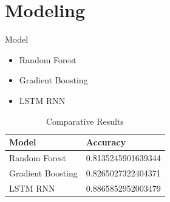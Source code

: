 \documentclass[
 size=14pt,
 paper=smartboard,  %
 mode=present, 		%
 display=slides, 	%
 style=tuliplab,  	%
 pauseslide,
 fleqn,leqno]{powerdot}
\begin{document}
\section{Modeling}


\begin{slide}[toc=,bm=]{Model}

\begin{itemize}
  \item Random Forest
  \item Gradient Boosting
  \item LSTM RNN
\end{itemize}

\begin{table}
\centering
\caption{Comparative Results}

\begin{tabular}{p{150pt} | p{200pt}}
\toprule
  Model & Accuracy\\
\hline
 Random Forest & 0.8135245901639344 \\
 Gradient Boosting & 0.8265027322404371  \\
 LSTM RNN & 0.8865852952003479  \\

\bottomrule

\end{tabular}
\end{table}

\end{slide}






\end{document}
